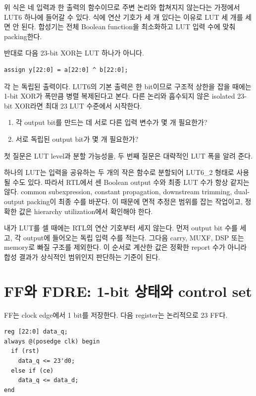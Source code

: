 위 식은 네 입력과 한 출력의 함수이므로 주변 논리와 합쳐지지 않는다는 가정에서
LUT6 하나에 들어갈 수 있다. 식에 연산 기호가 세 개 있다는 이유로 LUT 세 개를
세면 안 된다. 합성기는 전체 Boolean function을 최소화하고 LUT 입력 수에 맞춰
packing한다.

반대로 다음 23-bit XOR는 LUT 하나가 아니다.

\begin{lstlisting}
assign y[22:0] = a[22:0] ^ b[22:0];
\end{lstlisting}

각 는 독립된 출력이다. LUT6의 기본 출력은 한 bit이므로 구조적
상한을 잡을 때에는 1-bit XOR가 폭만큼 병렬 복제된다고 본다. 다른 논리와
흡수되지 않은 isolated 23-bit XOR라면 최대 23 LUT 수준에서 시작한다.

\begin{summarybox}[LUT를 셀 때의 두 질문]
\begin{enumerate}
  \item 각 output bit를 만드는 데 서로 다른 입력 변수가 몇 개 필요한가?
  \item 서로 독립된 output bit가 몇 개 필요한가?
\end{enumerate}
첫 질문은 LUT level과 분할 가능성을, 두 번째 질문은 대략적인 LUT 폭을 알려 준다.
\end{summarybox}

하나의 LUT는 입력을 공유하는 두 개의 작은 함수로 분할되어 LUT6\_2 형태로
사용될 수도 있다. 따라서 RTL에서 센 Boolean output 수와 최종 LUT 수가 항상
같지는 않다. common subexpression, constant propagation, downstream trimming,
dual-output packing이 최종 수를 바꾼다. 이 때문에 면적 추정은 범위를 잡는
작업이고, 정확한 값은 hierarchy utilization에서 확인해야 한다.

내가 LUT를 셀 때에는 RTL의 연산 기호부터 세지 않는다. 먼저 output bit 수를
세고, 각 output에 들어오는 독립 입력 수를 적는다. 그다음 carry, MUXF, DSP 또는
memory로 빠질 구조를 제외한다. 이 순서로 계산한 값은 정확한 report 수가 아니라
합성 결과가 상식적인 범위인지 판단하는 기준이 된다.

\section{FF와 FDRE: 1-bit 상태와 control set}

FF는 clock edge에서 1 bit를 저장한다. 다음 register는 논리적으로 23 FF다.

\begin{lstlisting}
reg [22:0] data_q;
always @(posedge clk) begin
  if (rst)
    data_q <= 23'd0;
  else if (ce)
    data_q <= data_d;
end
\end{lstlisting}

